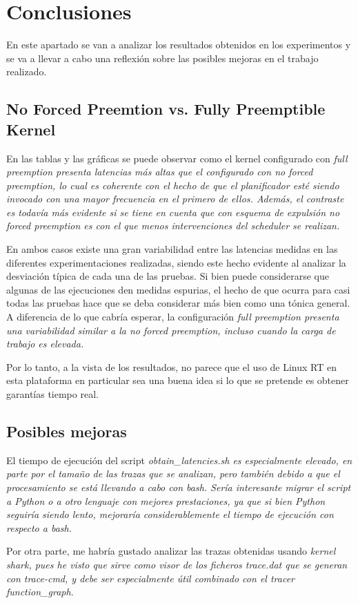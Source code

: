 \documentclass[../main.tex]{subfiles}
\begin{document}
\section{Conclusiones}

En este apartado se van a analizar los resultados obtenidos en los experimentos y se va a llevar a cabo una reflexión sobre las posibles mejoras en el trabajo realizado.

\subsection{No Forced Preemtion vs. Fully Preemptible Kernel}

En las tablas y las gráficas se puede observar como el kernel configurado con \it{full preemption} presenta latencias más altas que el configurado con \it{no forced preemption}, lo cual es coherente con el hecho de que el planificador esté siendo invocado con una mayor frecuencia en el primero de ellos. Además, el contraste es todavía más evidente si se tiene en cuenta que con esquema de expulsión \it{no forced preemption} es con el que menos intervenciones del scheduler se realizan.

En ambos casos existe una gran variabilidad entre las latencias medidas en las diferentes experimentaciones realizadas, siendo este hecho evidente al analizar la desviación típica de cada una de las pruebas. Si bien puede considerarse que algunas de las ejecuciones den medidas espurias, el hecho de que ocurra para casi todas las pruebas hace que se deba considerar más bien como una tónica general. A diferencia de lo que cabría esperar, la configuración \it{full preemption} presenta una variabilidad similar a la \it{no forced preemption}, incluso cuando la carga de trabajo es elevada.

Por lo tanto, a la vista de los resultados, no parece que el uso de Linux RT en esta plataforma en particular sea una buena idea si lo que se pretende es obtener garantías tiempo real.

\subsection{Posibles mejoras}

El tiempo de ejecución del script \it{obtain\_latencies.sh} es especialmente elevado, en parte por el tamaño de las trazas que se analizan, pero también debido a que el procesamiento se está llevando a cabo con bash. Sería interesante migrar el script a Python o a otro lenguaje con mejores prestaciones, ya que si bien Python seguiría siendo lento, mejoraría considerablemente el tiempo de ejecución con respecto a bash.

Por otra parte, me habría gustado analizar las trazas obtenidas usando \it{kernel shark}, pues he visto que sirve como visor de los ficheros \it{trace.dat} que se generan con \it{trace-cmd}, y debe ser especialmente útil combinado con el tracer \it{function\_graph}.
\end{document}
